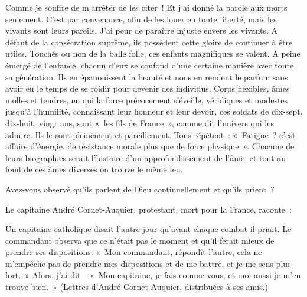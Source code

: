 \documentclass[french,twoside]{book} %
\newenvironment{quoteblock}%
  {\begin{quoting}}
  {\end{quoting}}
\newenvironment{quotebar}{%
    \def\FrameCommand{{\color{rubric!10!}\vrule width 0.5em} \hspace{0.9em}}%
    \def\OuterFrameSep{\itemsep} %
    \MakeFramed {\advance\hsize-\width \FrameRestore}
  }%
  {%
    \endMakeFramed
  }
\renewenvironment{quoteblock}%
  {%
    \savenotes
    \setstretch{0.9}
    \normalfont
    \begin{quotebar}
  }
  {%
    \end{quotebar}
    \spewnotes
  }
\begin{document}
Comme je souffre de m’arrêter de les citer ! Et j’ai donné la parole aux morts seulement. C’est par convenance, afin de les louer en toute liberté, mais les vivants sont leurs pareils. J’ai peur de paraître injuste envers les vivants. A défaut de la consécration suprême, ils possèdent cette gloire de continuer à être utiles. Touchés ou non de la balle folle, ces enfants magnifiques se valent. A peine émergé de l’enfance, chacun d’eux se confond d’une certaine manière avec toute sa génération. Ils en épanouissent la beauté et nous en rendent le parfum sans avoir eu le temps de se roidir pour devenir des individus. Corps flexibles, âmes molles et tendres, en qui la force précocement s’éveille, véridiques et modestes jusqu’à l’humilité, connaissant leur honneur et leur devoir, ces soldats de dix-sept, dix-huit, vingt ans, sont « les fils de France », comme dit l’univers qui les admire. Ils le sont pleinement et pareillement. Tous répètent : « Fatigue ? c’est affaire d’énergie, de résistance morale plus que de force physique ». Chacune de leurs biographies serait l’histoire d’un approfondissement de l’âme, et tout au fond de ces âmes diverses on trouve le même feu.‌\par
Avez-vous observé qu’ils parlent de Dieu continuellement et qu’ils prient ?‌\par
Le capitaine André Cornet-Auquier, protestant, mort pour la France, raconte :‌\par

\begin{quoteblock}
 \noindent Un capitaine catholique disait l’autre jour qu’avant chaque combat il priait. Le commandant observa que ce n’était pas le moment et qu’il ferait mieux de prendre ses dispositions. « Mon commandant, répondît l’autre, cela ne m’empêche pas de prendre mes dispositions et de me battre, et je me sens plus fort. » Alors, j’ai dit : « Mon capitaine, je fais comme vous, et moi aussi je m’en trouve bien. » (Lettres d’André Cornet-Auquier, distribuées à ses amis.)‌
 \end{quoteblock}
\end{document}
